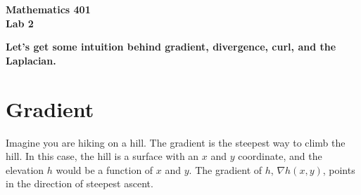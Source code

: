 \documentclass[11pt]{article}
\begin{document}
\noindent
{\bf Mathematics 401} \\
{\bf Lab 2} \\

\begin{center}
{\Large {\bf Let's get some intuition behind gradient, divergence, curl, and the Laplacian.}}
\end{center}

\section*{Gradient}
Imagine you are hiking on a hill.  The gradient is the steepest way to climb the hill.  In this case, the hill is a surface with an $x$ and $y$ coordinate, and the elevation $h$ would be a function of $x$ and $y$.  The gradient of $h$, $\nabla h(x,y)$, points in the direction of steepest ascent.  
\end{document}
